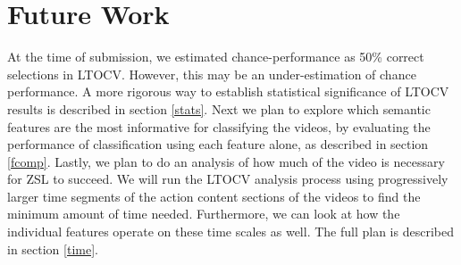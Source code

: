 \documentclass{article}
\begin{document}
\section{Future Work} %
At the time of submission, we estimated chance-performance as 50\% correct selections in LTOCV.  However, this may be an under-estimation of chance performance. A more rigorous way to establish statistical significance of LTOCV results is described in section \ref{stats}. 
Next we plan to explore which semantic features are the most informative for classifying the videos, by evaluating the performance of classification using each feature alone, as described in section \ref{fcomp}.
Lastly, we plan to do an analysis of how much of the video is necessary for ZSL to succeed. We will run the LTOCV analysis process using progressively larger time segments of the action content sections of the videos to find the minimum amount of time needed. Furthermore, we can look at how the individual features operate on these time scales as well. The full plan is described in section \ref{time}.


\end{document}
